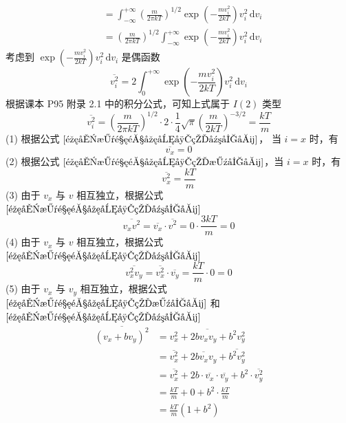 \begin{solution}
\begin{equation}
\begin{aligned}
             & = \int_{-\infty}^{+\infty} \left(\frac{m}{2\pi kT}\right)^{1/2} \exp\left(-\frac{mv_i^2}{2kT}\right) v_i^2 \,\mathrm{d}v_i \\
             & = \left(\frac{m}{2\pi kT}\right)^{1/2} \int_{-\infty}^{+\infty} \exp\left(-\frac{mv_i^2}{2kT}\right) v_i^2 \,\mathrm{d}v_i
        \end{aligned}
    \end{equation}
    考虑到 $\displaystyle \exp\left(-\frac{mv_i^2}{2kT}\right) v_i^2 \,\mathrm{d}v_i$ 是偶函数
    \begin{equation}
        \overline{v_i^2} = 2 \int_{0}^{+\infty}\exp\left(-\frac{mv_i^2}{2kT}\right) v_i^2 \,\mathrm{d}v_i
    \end{equation}
    根据课本 P95 附录 2.1 中的积分公式，可知上式属于 $I(2)$ 类型
    \begin{equation}
        \label{麦克斯韦速度分布的方均值}
        \overline{v_i^2}
        = \left(\frac{m}{2\pi kT}\right)^{1/2} \cdot 2 \cdot \frac{1}{4} \sqrt{\pi} \left(\frac{m}{2kT}\right)^{-3/2}
        = \frac{kT}{m}
    \end{equation}
    (1) 根据公式 $\eqref{麦克斯韦速度分布的平均值}$， 当 $i = x$ 时，有
    $$
        \overline{v_x} = 0
    $$
    (2) 根据公式 $\eqref{麦克斯韦速度分布的方均值}$，当 $i = x$ 时，有
    $$
        \overline{v_x^2} = \frac{kT}{m}
    $$
    (3) 由于 $v_x$ 与 $v$ 相互独立，根据公式 $\eqref{麦克斯韦速度分布的平均值}$
    $$
        \overline{v_x v^2} = \overline{v_x} \cdot \overline{v^2} = 0 \cdot \frac{3kT}{m} = 0
    $$
    (4) 由于 $v_x$ 与 $v$ 相互独立，根据公式 $\eqref{麦克斯韦速度分布的平均值}$
    $$
        \overline{v_x^2 v_y} = \overline{v_x^2} \cdot \overline{v_y} = \frac{kT}{m} \cdot 0 = 0
    $$
    (5) 由于 $v_x$ 与 $v_y$ 相互独立，根据公式 $\eqref{麦克斯韦速度分布的方均值}$ 和 $\eqref{麦克斯韦速度分布的平均值}$
    $$
        \begin{aligned}
            \overline{(v_x + bv_y)^2}
             & = \overline{v_x^2 + 2bv_xv_y + b^2v_y^2}                                                       \\
             & = \overline{v_x^2} + \overline{2bv_xv_y} + \overline{b^2v_y^2}                                 \\
             & = \overline{v_x^2} + 2b \cdot \overline{v_x} \cdot \overline{v_y} + b^2 \cdot \overline{v_y^2} \\
             & = \frac{kT}{m} + 0 + b^2 \cdot \frac{kT}{m}                                                    \\
             & = \frac{kT}{m}(1+b^2)
        \end{aligned}
    $$
\end{solution}

